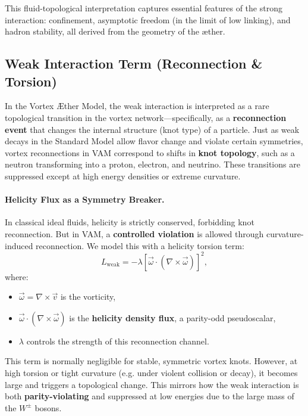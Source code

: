 \documentclass[a4paper,12pt]{article}
\begin{document}
\medskip
This fluid-topological interpretation captures essential features of the strong interaction: confinement, asymptotic freedom (in the limit of low linking), and hadron stability, all derived from the geometry of the æther.
\subsection{Weak Interaction Term (Reconnection \& Torsion)}

In the Vortex \AE ther Model, the weak interaction is interpreted as a rare topological transition in the vortex network—specifically, as a \textbf{reconnection event} that changes the internal structure (knot type) of a particle. Just as weak decays in the Standard Model allow flavor change and violate certain symmetries, vortex reconnections in VAM correspond to shifts in \textbf{knot topology}, such as a neutron transforming into a proton, electron, and neutrino. These transitions are suppressed except at high energy densities or extreme curvature.

\vspace{0.5em}
\paragraph{Helicity Flux as a Symmetry Breaker.}
In classical ideal fluids, helicity is strictly conserved, forbidding knot reconnection. But in VAM, a \textbf{controlled violation} is allowed through curvature-induced reconnection. We model this with a helicity torsion term:
\begin{equation}
    L_{\text{weak}} = -\lambda \left[ \vec{\omega} \cdot (\nabla \times \vec{\omega}) \right]^2,
    \label{eq:weak-helicity-term}
\end{equation}
where:
\begin{itemize}
    \item \( \vec{\omega} = \nabla \times \vec{v} \) is the vorticity,
    \item \( \vec{\omega} \cdot (\nabla \times \vec{\omega}) \) is the \textbf{helicity density flux}, a parity-odd pseudoscalar,
    \item \( \lambda \) controls the strength of this reconnection channel.
\end{itemize}

This term is normally negligible for stable, symmetric vortex knots. However, at high torsion or tight curvature (e.g. under violent collision or decay), it becomes large and triggers a topological change. This mirrors how the weak interaction is both \textbf{parity-violating} and suppressed at low energies due to the large mass of the \( W^\pm \) bosons.
\end{document}
